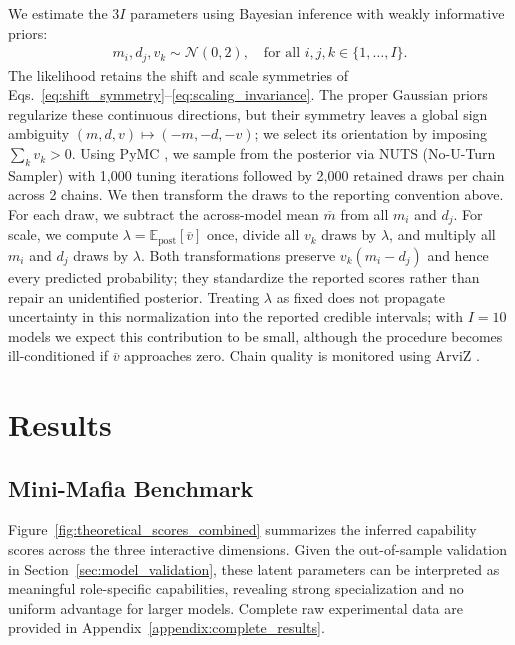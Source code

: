\documentclass[sigconf,anonymous,balance=false]{aamas}
\begin{document}
We estimate the $3I$ parameters using Bayesian inference with weakly informative priors:
\begin{align}
m_i, d_j, v_k \sim \mathcal{N}(0, 2), \quad \text{for all } i, j, k \in \{1, \ldots, I\}.
\label{eq:bayesian_inference}
\end{align}
The likelihood retains the shift and scale symmetries of Eqs.~\eqref{eq:shift_symmetry}--\eqref{eq:scaling_invariance}. The proper Gaussian priors regularize these continuous directions, but their symmetry leaves a global sign ambiguity $(m,d,v)\mapsto(-m,-d,-v)$; we select its orientation by imposing $\sum_k v_k>0$. Using PyMC \citep{pymc2023}, we sample from the posterior via NUTS (No-U-Turn Sampler) with 1,000 tuning iterations followed by 2,000 retained draws per chain across 2 chains. We then transform the draws to the reporting convention above. For each draw, we subtract the across-model mean $\overline{m}$ from all $m_i$ and $d_j$. For scale, we compute $\lambda=\mathbb{E}_{\mathrm{post}}[\overline{v}]$ once, divide all $v_k$ draws by $\lambda$, and multiply all $m_i$ and $d_j$ draws by $\lambda$. Both transformations preserve $v_k(m_i-d_j)$ and hence every predicted probability; they standardize the reported scores rather than repair an unidentified posterior. Treating $\lambda$ as fixed does not propagate uncertainty in this normalization into the reported credible intervals; with $I=10$ models we expect this contribution to be small, although the procedure becomes ill-conditioned if $\overline{v}$ approaches zero. Chain quality is monitored using ArviZ \citep{arviz2019}.

\section{Results}
\label{sec:results}

\subsection{Mini-Mafia Benchmark}
\label{sec:ddd_results}

Figure~\ref{fig:theoretical_scores_combined} summarizes the inferred capability scores across the three interactive dimensions. Given the out-of-sample validation in Section~\ref{sec:model_validation}, these latent parameters can be interpreted as meaningful role-specific capabilities, revealing strong specialization and no uniform advantage for larger models. Complete raw experimental data are provided in Appendix~\ref{appendix:complete_results}.
\end{document}
